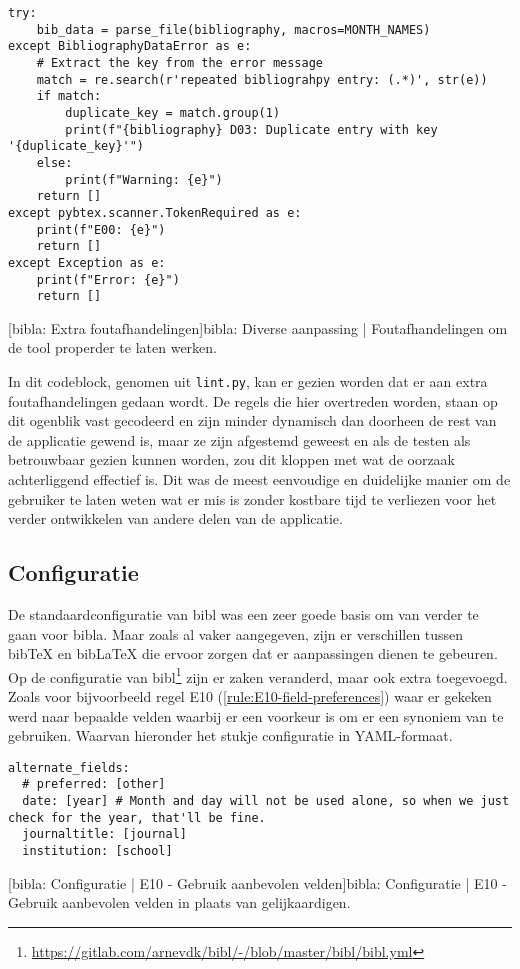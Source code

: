\begin{verbatim}
try:
    bib_data = parse_file(bibliography, macros=MONTH_NAMES)
except BibliographyDataError as e:
    # Extract the key from the error message
    match = re.search(r'repeated bibliograhpy entry: (.*)', str(e))
    if match:
        duplicate_key = match.group(1)
        print(f"{bibliography} D03: Duplicate entry with key '{duplicate_key}'")
    else:
        print(f"Warning: {e}")
    return []
except pybtex.scanner.TokenRequired as e:
    print(f"E00: {e}")
    return []
except Exception as e:
    print(f"Error: {e}")
    return []
\end{verbatim}
[bibla: Extra foutafhandelingen]{bibla: Diverse aanpassing | Foutafhandelingen om de tool properder te laten werken. \label{lst:bibla_foutafhandelingen_voorbeeld}}

In dit codeblock, genomen uit \texttt{lint.py}, kan er gezien worden dat er aan extra foutafhandelingen gedaan wordt. De regels die hier overtreden worden, staan op dit ogenblik vast gecodeerd en zijn minder dynamisch dan doorheen de rest van de applicatie gewend is, maar ze zijn afgestemd geweest en als de testen als betrouwbaar gezien kunnen worden, zou dit kloppen met wat de oorzaak achterliggend effectief is. Dit was de meest eenvoudige en duidelijke manier om de gebruiker te laten weten wat er mis is zonder kostbare tijd te verliezen voor het verder ontwikkelen van andere delen van de applicatie.

\subsection{Configuratie}
De standaardconfiguratie van bibl was een zeer goede basis om van verder te gaan voor bibla. Maar zoals al vaker aangegeven, zijn er verschillen tussen bibTeX en bibLaTeX die ervoor zorgen dat er aanpassingen dienen te gebeuren. Op de configuratie van bibl\footnote{\url{https://gitlab.com/arnevdk/bibl/-/blob/master/bibl/bibl.yml}} zijn er zaken veranderd, maar ook extra toegevoegd. Zoals voor bijvoorbeeld regel E10 (\ref{rule:E10-field-preferences}) waar er gekeken werd naar bepaalde velden waarbij er een voorkeur is om er een synoniem van te gebruiken. Waarvan hieronder het stukje configuratie in YAML-formaat.


\begin{verbatim}
alternate_fields:
  # preferred: [other]
  date: [year] # Month and day will not be used alone, so when we just check for the year, that'll be fine.
  journaltitle: [journal]
  institution: [school]
\end{verbatim}
[bibla: Configuratie | E10 - Gebruik aanbevolen velden]{bibla: Configuratie | E10 - Gebruik aanbevolen velden in plaats van gelijkaardigen. \label{lst:bibla_AC_E10}}
   
